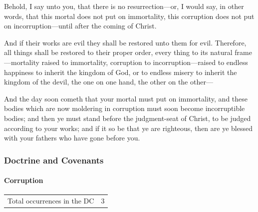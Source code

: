 \begin{compactdesc}
				\item[Alma 40:2] Behold, I say unto you, that there is no resurrection---or, I would say, in other words, that this mortal does not put on immortality, this corruption does not put on incorruption---until after the coming of Christ.
				\item[Alma 41:4] And if their works are evil they shall be restored unto them for evil. Therefore, all things shall be restored to their proper order, every thing to its natural frame---mortality raised to immortality, corruption to incorruption---raised to endless happiness to inherit the kingdom of God, or to endless misery to inherit the kingdom of the devil, the one on one hand, the other on the other---
				\item[Mormon 6:21] And the day soon cometh that your mortal must put on immortality, and these bodies which are now moldering in corruption must soon become incorruptible bodies; and then ye must stand before the judgment-seat of Christ, to be judged according to your works; and if it so be that ye are righteous, then are ye blessed with your fathers who have gone before you.
			\end{compactdesc}
		
	\subsubsection{Doctrine and Covenants} %
		\label{CORRUPTION-DC}
		
		\paragraph{Corruption}
	
			\begin{tabular}{ll}
				Total occurrences in the DC & 3
			\end{tabular}
			
